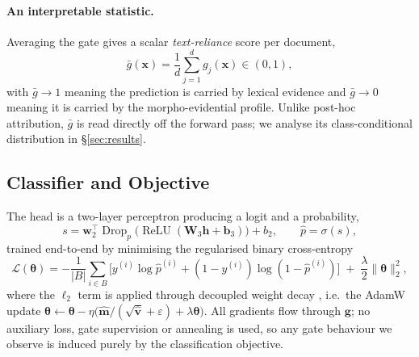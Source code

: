 \paragraph{An interpretable statistic.}
Averaging the gate gives a scalar \emph{text-reliance} score per document,
\begin{equation}
\bar{g}(\mathbf{x})=\frac{1}{d}\sum_{j=1}^{d}g_j(\mathbf{x})\in(0,1),
\label{eq:gbar}
\end{equation}
with $\bar g\to1$ meaning the prediction is carried by lexical evidence and $\bar g\to0$ meaning it is
carried by the morpho-evidential profile. Unlike post-hoc attribution, $\bar g$ is read directly off the
forward pass; we analyse its class-conditional distribution in \S\ref{sec:results}.

\subsection{Classifier and Objective}
\label{sec:objective}

The head is a two-layer perceptron producing a logit and a probability,
\begin{equation}
s=\mathbf{w}_2^{\top}\operatorname{Drop}_{p}\big(\operatorname{ReLU}(\mathbf{W}_3\mathbf{h}+\mathbf{b}_3)\big)+b_2,
\qquad \hat{p}=\sigma(s),
\end{equation}
trained end-to-end by minimising the regularised binary cross-entropy
\begin{equation}
\mathcal{L}(\bm{\theta})=-\frac{1}{|B|}\sum_{i\in B}\Big[y^{(i)}\log\hat p^{(i)}+(1-y^{(i)})\log(1-\hat p^{(i)})\Big]
\;+\;\frac{\lambda}{2}\lVert\bm{\theta}\rVert_2^{2},
\end{equation}
where the $\ell_2$ term is applied through decoupled weight decay \citep{loshchilov2019adamw}, i.e.\ the
AdamW update $\bm{\theta}\leftarrow\bm{\theta}-\eta\big(\hat{\mathbf{m}}/(\sqrt{\hat{\mathbf{v}}}+\varepsilon)+\lambda\bm{\theta}\big)$.
All gradients flow through $\mathbf{g}$; no auxiliary loss, gate supervision or annealing is used, so any
gate behaviour we observe is induced purely by the classification objective.

